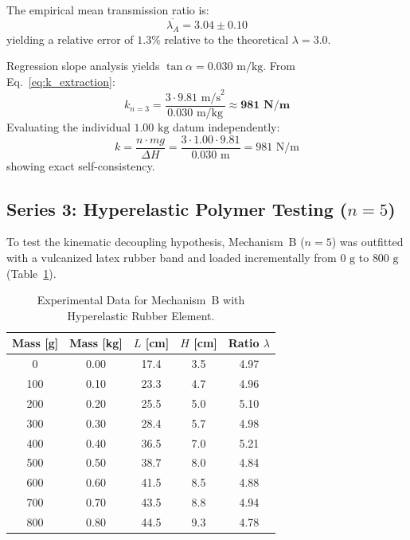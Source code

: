 \documentclass[10pt,twocolumn]{article}
\begin{document}
The empirical mean transmission ratio is:
\begin{equation}
    \overline{\lambda_A} = 3.04 \pm 0.10
\end{equation}
yielding a relative error of $1.3\%$ relative to the theoretical $\lambda = 3.0$.

Regression slope analysis yields $\tan \alpha = 0.030\text{ m/kg}$. From Eq.~\eqref{eq:k_extraction}:
\begin{equation}
    k_{n=3} = \frac{3 \cdot 9.81\text{ m/s}^2}{0.030\text{ m/kg}} \approx \mathbf{981\text{ N/m}}
\end{equation}
Evaluating the individual $1.00\text{ kg}$ datum independently:
\begin{equation}
    k = \frac{n \cdot m g}{\Delta H} = \frac{3 \cdot 1.00 \cdot 9.81}{0.030\text{ m}} = 981\text{ N/m}
\end{equation}
showing exact self-consistency.

\subsection{Series 3: Hyperelastic Polymer Testing ($n=5$)}

To test the kinematic decoupling hypothesis, Mechanism~B ($n=5$) was outfitted with a vulcanized latex rubber band and loaded incrementally from $0\text{ g}$ to $800\text{ g}$ (Table~\ref{tab:rubber}).

\begin{table}[H]
\centering
\footnotesize
\setlength{\tabcolsep}{3.0pt}
\caption{Experimental Data for Mechanism~B with Hyperelastic Rubber Element.}
\label{tab:rubber}
\begin{tabular}{@{}ccccc@{}}
\toprule
\textbf{Mass [g]} & \textbf{Mass [kg]} & \textbf{$L$ [cm]} & \textbf{$H$ [cm]} & \textbf{Ratio $\lambda$} \\
\midrule
0   & 0.00 & 17.4 & 3.5 & 4.97 \\
100 & 0.10 & 23.3 & 4.7 & 4.96 \\
200 & 0.20 & 25.5 & 5.0 & 5.10 \\
300 & 0.30 & 28.4 & 5.7 & 4.98 \\
400 & 0.40 & 36.5 & 7.0 & 5.21 \\
500 & 0.50 & 38.7 & 8.0 & 4.84 \\
600 & 0.60 & 41.5 & 8.5 & 4.88 \\
700 & 0.70 & 43.5 & 8.8 & 4.94 \\
800 & 0.80 & 44.5 & 9.3 & 4.78 \\
\bottomrule
\end{tabular}
\end{table}
\end{document}
